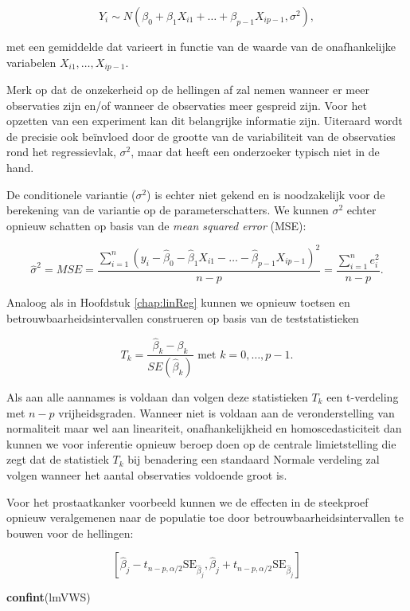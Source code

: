 \documentclass[
  12pt,dutch,coursenotes]{book}
\newenvironment{Shaded}{\begin{snugshade}}{\end{snugshade}}
\newcommand{\KeywordTok}[1]{\textcolor[rgb]{0.13,0.29,0.53}{\textbf{#1}}}
\newcommand{\NormalTok}[1]{#1}
\theoremstyle{definition}
\theoremstyle{definition}
\theoremstyle{definition}
\theoremstyle{remark}
\begin{document}
\[Y_i\sim N(\beta_0+\beta_1 X_{i1}+\ldots+\beta_{p-1} X_{ip-1},\sigma^2),\]

met een gemiddelde dat varieert in functie van de waarde van de onafhankelijke variabelen \(X_{i1},\ldots,X_{ip-1}\).

Merk op dat de onzekerheid op de hellingen af zal nemen wanneer er meer observaties zijn en/of wanneer de observaties meer gespreid zijn. Voor het opzetten van een experiment kan dit belangrijke informatie zijn. Uiteraard wordt de precisie ook beïnvloed door de grootte van de variabiliteit van de observaties rond het regressievlak, \(\sigma^2\), maar dat heeft een onderzoeker typisch niet in de hand.

De conditionele variantie (\(\sigma^2\)) is echter niet gekend en is noodzakelijk voor de berekening van de variantie op de parameterschatters. We kunnen \(\sigma^2\) echter opnieuw schatten op basis van de \emph{mean squared error} (MSE):

\[\hat\sigma^2=MSE=\frac{\sum\limits_{i=1}^n \left(y_i-\hat\beta_0-\hat\beta_1 X_{i1}-\ldots-\hat\beta_{p-1} X_{ip-1}\right)^2}{n-p}=\frac{\sum\limits_{i=1}^n e^2_i}{n-p}.\]

Analoog als in Hoofdstuk \ref{chap:linReg} kunnen we opnieuw toetsen en betrouwbaarheidsintervallen construeren op basis van de teststatistieken

\[T_k=\frac{\hat{\beta}_k-\beta_k}{SE(\hat{\beta}_k)} \text{ met } k=0, \ldots, p-1.\]

Als aan alle aannames is voldaan dan volgen deze statistieken \(T_k\) een t-verdeling met \(n-p\) vrijheidsgraden.
Wanneer niet is voldaan aan de veronderstelling van normaliteit maar wel aan lineariteit, onafhankelijkheid en homoscedasticiteit dan kunnen we voor inferentie opnieuw beroep doen op de centrale limietstelling die zegt dat de statistiek \(T_k\) bij benadering een standaard Normale verdeling zal volgen wanneer het aantal observaties voldoende groot is.

Voor het prostaatkanker voorbeeld kunnen we de effecten in de steekproef opnieuw veralgemenen naar de populatie toe door betrouwbaarheidsintervallen te bouwen voor de hellingen:

\[
[\hat\beta_j - t_{n-p,\alpha/2} \text{SE}_{\hat\beta_j},\hat\beta_j + t_{n-p,\alpha/2} \text{SE}_{\hat\beta_j}]
\]

\begin{Shaded}
\begin{Highlighting}[]
\KeywordTok{confint}\NormalTok{(lmVWS)}
\end{Highlighting}
\end{Shaded}
\end{document}
